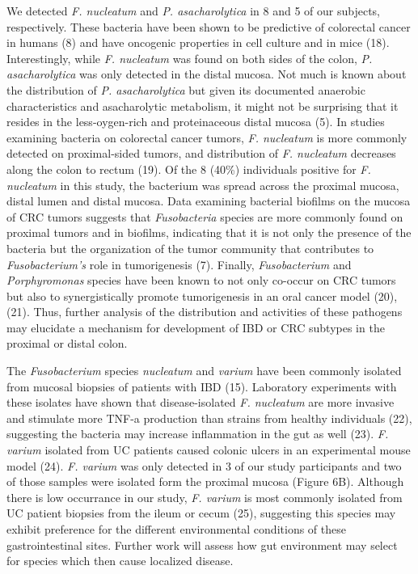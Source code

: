 \documentclass[11pt,]{article}
\begin{document}
We detected \emph{F. nucleatum} and \emph{P. asacharolytica} in 8 and 5
of our subjects, respectively. These bacteria have been shown to be
predictive of colorectal cancer in humans (8) and have oncogenic
properties in cell culture and in mice (18). Interestingly, while
\emph{F. nucleatum} was found on both sides of the colon, \emph{P.
asacharolytica} was only detected in the distal mucosa. Not much is
known about the distribution of \emph{P. asacharolytica} but given its
documented anaerobic characteristics and asacharolytic metabolism, it
might not be surprising that it resides in the less-oygen-rich and
proteinaceous distal mucosa (5). In studies examining bacteria on
colorectal cancer tumors, \emph{F. nucleatum} is more commonly detected
on proximal-sided tumors, and distribution of \emph{F. nucleatum}
decreases along the colon to rectum (19). Of the 8 (40\%) individuals
positive for \emph{F. nucleatum} in this study, the bacterium was spread
across the proximal mucosa, distal lumen and distal mucosa. Data
examining bacterial biofilms on the mucosa of CRC tumors suggests that
\emph{Fusobacteria} species are more commonly found on proximal tumors
and in biofilms, indicating that it is not only the presence of the
bacteria but the organization of the tumor community that contributes to
\emph{Fusobacterium's} role in tumorigenesis (7). Finally,
\emph{Fusobacterium} and \emph{Porphyromonas} species have been known to
not only co-occur on CRC tumors but also to synergistically promote
tumorigenesis in an oral cancer model (20), (21). Thus, further analysis
of the distribution and activities of these pathogens may elucidate a
mechanism for development of IBD or CRC subtypes in the proximal or
distal colon.

The \emph{Fusobacterium} species \emph{nucleatum} and \emph{varium} have
been commonly isolated from mucosal biopsies of patients with IBD (15).
Laboratory experiments with these isolates have shown that
disease-isolated \emph{F. nucleatum} are more invasive and stimulate
more TNF-a production than strains from healthy individuals (22),
suggesting the bacteria may increase inflammation in the gut as well
(23). \emph{F. varium} isolated from UC patients caused colonic ulcers
in an experimental mouse model (24). \emph{F. varium} was only detected
in 3 of our study participants and two of those samples were isolated
form the proximal mucosa (Figure 6B). Although there is low occurrance
in our study, \emph{F. varium} is most commonly isolated from UC patient
biopsies from the ileum or cecum (25), suggesting this species may
exhibit preference for the different environmental conditions of these
gastrointestinal sites. Further work will assess how gut environment may
select for species which then cause localized disease.
\end{document}
